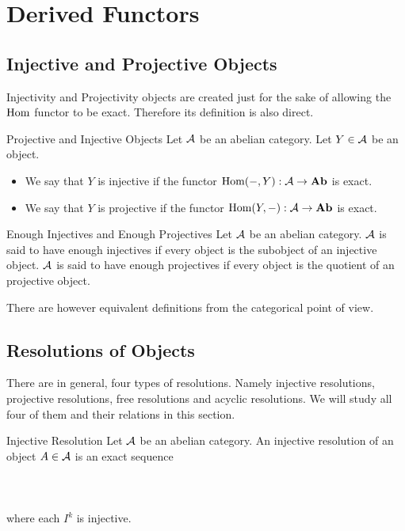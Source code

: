 \documentclass[a4paper]{article}
\begin{document}
\pagebreak
\section{Derived Functors}
\subsection{Injective and Projective Objects}
Injectivity and Projectivity objects are created just for the sake of allowing the $\operatorname{Hom}$ functor to be exact. Therefore its definition is also direct. 

\begin{defn}{Projective and Injective Objects}{} Let $\mathcal{A}$ be an abelian category. Let $Y\in\mathcal{A}$ be an object. 
\begin{itemize}
\item We say that $Y$ is injective if the functor $\operatorname{Hom}(-,Y):\mathcal{A}\to\bold{Ab}$ is exact. 
\item We say that $Y$ is projective if the functor $\operatorname{Hom}(Y,-):\mathcal{A}\to\bold{Ab}$ is exact. 
\end{itemize}
\end{defn}

\begin{defn}{Enough Injectives and Enough Projectives}{} Let $\mathcal{A}$ be an abelian category. $\mathcal{A}$ is said to have enough injectives if every object is the subobject of an injective object. $\mathcal{A}$ is said to have enough projectives if every object is the quotient of an projective object. 
\end{defn}

There are however equivalent definitions from the categorical point of view. 

\subsection{Resolutions of Objects}
There are in general, four types of resolutions. Namely injective resolutions, projective resolutions, free resolutions and acyclic resolutions. We will study all four of them and their relations in this section. 

\begin{defn}{Injective Resolution}{} Let $\mathcal{A}$ be an abelian category. An injective resolution of an object $A\in\mathcal{A}$ is an exact sequence \\~\\
\\~\\
where each $I^k$ is injective. 
\end{defn}
\end{document}
